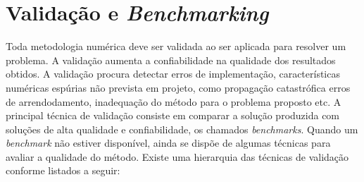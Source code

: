 \section{Validação e {\it Benchmarking}} %
Toda metodologia numérica deve ser validada ao ser aplicada para resolver um problema. A validação aumenta a confiabilidade na qualidade dos resultados obtidos. A validação procura detectar erros de implementação, características numéricas espúrias não prevista em projeto, como propagação catastrófica erros de arrendodamento, inadequação do método para o problema proposto etc.  A principal técnica de validação consiste em comparar a solução produzida com soluções de alta qualidade e confiabilidade, os chamados {\it benchmarks}. Quando um {\it benchmark} não estiver disponível, ainda se dispõe de algumas técnicas para avaliar a qualidade do método. Existe uma hierarquia das técnicas de  validação conforme listados a seguir:
